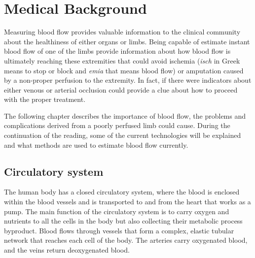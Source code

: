 
\chapter{Medical Background}
\label{chapter1}

\ifpdf
    \graphicspath{{Chapter2/Figs/Raster/}{Chapter2/Figs/PDF/}{Chapter2/Figs/}}
\else
    \graphicspath{{Chapter2/Figs/Vector/}{Chapter2/Figs/}}
\fi

Measuring blood flow provides valuable information to the clinical community about the healthiness of either organs or limbs. Being capable of estimate instant blood flow of one of the limbs provide information about how blood flow is ultimately reaching these extremities that could avoid ischemia (\textit{isch} in Greek means to stop or block and \textit{emia} that means blood flow) or amputation caused by a non-proper perfusion to the extremity. In fact, if there were indicators about either venous or arterial occlusion could provide a clue about how to proceed with the proper treatment.


The following chapter describes the importance of blood flow, the problems and complications derived from a poorly perfused limb could cause. During the continuation of the reading, some of the current technologies will be explained and what methods are used to estimate blood flow currently.  

\section{Circulatory system} %
\label{section literature 1}
The human body has a closed circulatory system, where the blood is enclosed within the blood vessels and is transported to and from the heart that works as a pump. The main function of the circulatory system is to carry oxygen and nutrients to all the cells in the body but also collecting their metabolic process byproduct. Blood flows through vessels that form a complex, elastic tubular network that reaches each cell of the body. The arteries carry oxygenated blood, and the veins return deoxygenated blood. 

